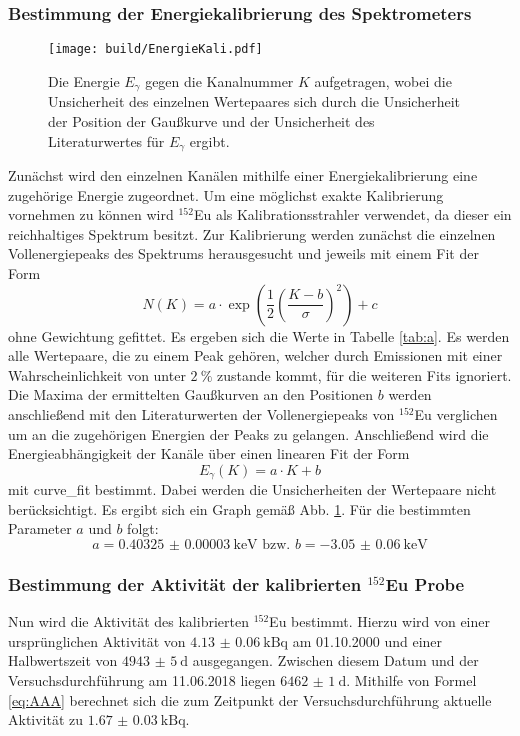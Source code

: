 \subsubsection{Bestimmung der Energiekalibrierung des Spektrometers}
\label{subsec:EnergieKali}
\begin{figure}
	\centering
	\texttt{[image: build/EnergieKali.pdf]}
	\caption{Die Energie $E_\gamma$ gegen die Kanalnummer $K$ aufgetragen, wobei die Unsicherheit des einzelnen Wertepaares sich durch die Unsicherheit der Position der Gaußkurve und der Unsicherheit des Literaturwertes für $E_\gamma$ ergibt.}
	\label{fig:E}
\end{figure}
Zunächst wird den einzelnen Kanälen mithilfe einer Energiekalibrierung eine zugehörige Energie zugeordnet. Um eine möglichst exakte Kalibrierung vornehmen zu können wird $^{152}$Eu als Kalibrationsstrahler verwendet, da dieser ein reichhaltiges Spektrum besitzt. Zur Kalibrierung werden zunächst die einzelnen Vollenergiepeaks des Spektrums herausgesucht und jeweils mit einem Fit der Form
\begin{equation}
    N(K)=a \cdot \exp\left(\frac{1}{2}\left( \frac{K-b}{\sigma}\right)^2\right) +c
\end{equation}
ohne Gewichtung gefittet. Es ergeben sich die Werte in Tabelle \ref{tab:a}. Es werden alle Wertepaare, die zu einem Peak gehören, welcher durch Emissionen mit einer Wahrscheinlichkeit von unter $\SI{2}{\percent}$ zustande kommt, für die weiteren Fits ignoriert. Die Maxima der ermittelten Gaußkurven an den Positionen $b$ werden anschließend mit den Literaturwerten der Vollenergiepeaks von $^{152}$Eu \cite{MARTIN20131497} verglichen um an die zugehörigen Energien der Peaks zu gelangen. Anschließend wird die Energieabhängigkeit der Kanäle über einen linearen Fit der Form 
\begin{equation}
	E_\gamma(K)=a \cdot K+b 
\end{equation}
mit curve\_fit \cite{scipy} bestimmt. Dabei werden die Unsicherheiten der Wertepaare nicht berücksichtigt. Es ergibt sich ein Graph gemäß Abb. \ref{fig:E}. Für die bestimmten Parameter $a$ und $b$ folgt:
\begin{equation}
a = \SI{0.40325(3)}{\kilo\electronvolt} \text{ bzw. } b = \SI{-3.05(6)}{\kilo\electronvolt}
\end{equation}


\subsubsection{Bestimmung der Aktivität der kalibrierten $^{152}$Eu Probe}
Nun wird die Aktivität des kalibrierten $^{152}$Eu bestimmt. Hierzu wird von einer ursprünglichen Aktivität von $\SI{4.13(6)}{\kilo\becquerel}$ am 01.10.2000 und einer Halbwertszeit von $\SI{4943(5)}{\day}$ \cite{V18} ausgegangen. Zwischen diesem Datum und der Versuchsdurchführung am 11.06.2018 liegen $\SI{6462(1)}{\day}$. Mithilfe von Formel \eqref{eq:AAA} berechnet sich die zum Zeitpunkt der Versuchsdurchführung aktuelle Aktivität zu $\SI{1.67(3)}{\kilo\becquerel}$.


